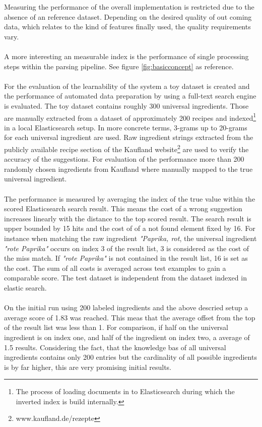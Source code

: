 Measuring the performance of the overall implementation is restricted due to the absence of an reference dataset. Depending on the desired quality of out coming data, which relates to the kind of features finally used, the quality requirements vary. 
\\\\
A more interesting an measurable index is the performance of single processing steps within the parsing pipeline. See figure \ref{fig:basicconcept} as reference. 
\\\\
For the evaluation of the learnability of the system a toy dataset is created and the performance of automated data preparation by using a full-text search engine is evaluated. The toy dataset contains roughly 300 universal ingredients. Those are manually extracted from a dataset of approximately 200 recipes and indexed\footnote{The process of loading documents in to Elasticsearch during which the inverted index is build internally.} in a local Elasticsearch setup. In more concrete terms, 3-grams up to 20-grams for each universal ingredient are used. Raw ingredient strings extracted from the publicly available recipe section of the Kaufland website\footnote{www.kaufland.de/rezepte} are used to verify the accuracy of the suggestions. For evaluation of the performance more than 200 randomly chosen ingredients from Kaufland where manually mapped to the true universal ingredient. 
\\\\
The performance is measured by averaging the index of the true value within the scored Elasticsearch search result. This means the cost of a wrong suggestion increases linearly with the distance to the top scored result. The search result is upper bounded by 15 hits and the cost of of a not found element fixed by 16. For instance when matching the raw ingredient \textit{"Paprika, rot}, the universal ingredient \textit{"rote Paprika"} occurs on index 3 of the result list, 3 is considered as the cost of the miss match. If \textit{"rote Paprika"} is not contained in the result list, 16 is set as the cost. The sum of all costs is averaged across test examples to gain a comparable score. The test dataset is independent from the dataset indexed in elastic search.
\\\\
On the initial run using 200 labeled ingredients and the above descried setup a average score of 1.83 was reached. This meas that the average offset from the top of the result list was less than 1. For comparison, if half on the universal ingredient is on index one, and half of the ingredient on index two, a average of 1.5 results. Considering the fact, that the knowledge bas of all universal ingredients contains only 200 entries but the cardinality of all possible ingredients is by far higher, this are very promising initial results. 

